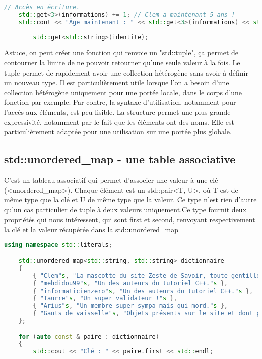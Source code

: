 \documentclass{article}
\begin{document}
\begin{itemize}
\begin{lstlisting}[language=C++]
    // Accès en écriture.
    std::get<3>(informations) += 1; // Clem a maintenant 5 ans !
    std::cout << "Âge maintenant : " << std::get<3>(informations) << std::endl;
    
        std::get<std::string>(identite);
\end{lstlisting}{}

Astuce, on peut créer une fonction qui renvoie un "std::tuple", ça permet de contourner la limite de ne pouvoir retourner qu'une seule valeur à la fois. 
Le tuple permet de rapidement avoir une collection hétérogène sans avoir à définir un nouveau type. Il est particulièrement utile lorsque l’on a besoin d’une collection hétérogène uniquement pour une portée locale, dans le corps d’une fonction par exemple. Par contre, la syntaxe d’utilisation, notamment pour l’accès aux éléments, est peu lisible.
La structure permet une plus grande expressivité, notamment par le fait que les éléments ont des noms. Elle est particulièrement adaptée pour une utilisation sur une portée plus globale.

\subsection{std::unordered_map - une table associative}
C'est un tableau associatif qui permet d'associer une valeur à une clé (<unordered\_map>). Chaque élément est un std::pair<T, U>, où T est de même type que la clé et U de même type que la valeur. Ce type n’est rien d’autre qu’un cas particulier de tuple à deux valeurs uniquement.Ce type fournit deux propriétés qui nous intéressent, qui sont first et second, renvoyant respectivement la clé et la valeur récupérée dans la std::unordered\_map

\begin{lstlisting}[language=C++]
    using namespace std::literals;

    std::unordered_map<std::string, std::string> dictionnaire
    {
        { "Clem"s, "La mascotte du site Zeste de Savoir, toute gentille et toute mignonne."s },
        { "mehdidou99"s, "Un des auteurs du tutoriel C++."s },
        { "informaticienzero"s, "Un des auteurs du tutoriel C++."s },
        { "Taurre"s, "Un super validateur !"s },
        { "Arius"s, "Un membre super sympa mais qui mord."s },
        { "Gants de vaisselle"s, "Objets présents sur le site et dont personne ne sait pourquoi."s }
    };

    for (auto const & paire : dictionnaire)
    {
        std::cout << "Clé : " << paire.first << std::endl;
        

\end{lstlisting}
\end{itemize}
\end{document}
